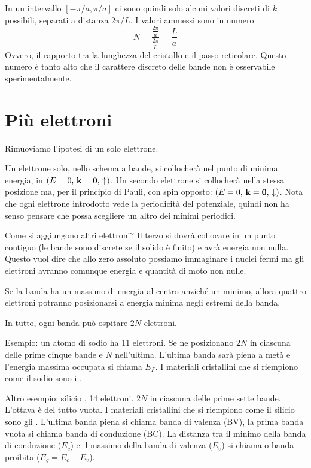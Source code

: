 In un intervallo $[-\pi / a, \pi / a]$ ci sono quindi solo alcuni valori discreti di $k$ possibili, separati a distanza $2\pi / L$.
I valori ammessi sono in numero
\begin{equation}
    N = \frac{\frac{2\pi}{a}}{\frac{2\pi}{L}} = \frac{L}{a}
\end{equation}
Ovvero, il rapporto tra la lunghezza del cristallo e il passo reticolare.
Questo numero è tanto alto che il carattere discreto delle bande non è osservabile sperimentalmente.

\section{Più elettroni}

Rimuoviamo l'ipotesi di un solo elettrone.

Un elettrone solo, nello schema a bande, si collocherà nel punto di minima energia, in $(E = 0, \, \mathbf{k} = \mathbf{0}, \, \uparrow)$.
Un secondo elettrone si collocherà nella stessa posizione ma, per il principio di Pauli, con spin opposto: $(E = 0, \, \mathbf{k} = \mathbf{0}, \, \downarrow)$.
Nota che ogni elettrone introdotto vede la periodicità del potenziale, quindi non ha senso pensare che possa scegliere un altro dei minimi periodici.

Come si aggiungono altri elettroni?
Il terzo si dovrà collocare in un punto contiguo (le bande sono discrete se il solido è finito) e avrà energia non nulla.
Questo vuol dire che allo zero assoluto possiamo immaginare i nuclei fermi ma gli elettroni avranno comunque energia e quantità di moto non nulle.

Se la banda ha un massimo di energia al centro anziché un minimo, allora quattro elettroni potranno posizionarsi a energia minima negli estremi della banda.

In tutto, ogni banda può ospitare $2 N$ elettroni.

Esempio: un atomo di sodio  ha 11 elettroni.
Se ne posizionano $2 N$ in ciascuna delle prime cinque bande e $N$ nell'ultima.
L'ultima banda sarà piena a metà e l'energia massima occupata si chiama  $E_F$.
I materiali cristallini che si riempiono come il sodio sono i .

Altro esempio: silicio , 14 elettroni.
$2 N$ in ciascuna delle prime sette bande.
L'ottava è del tutto vuota.
I materiali cristallini che si riempiono come il silicio sono gli .
L'ultima banda piena si chiama banda di valenza (BV), la prima banda vuota si chiama banda di conduzione (BC).
La distanza tra il minimo della banda di conduzione ($E_c$) e il massimo della banda di valenza ($E_v$) si chiama  o banda proibita ($E_g = E_c - E_v$).


